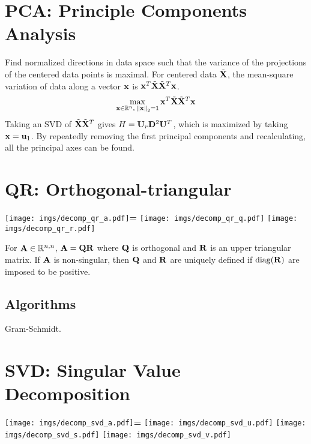 \section{PCA: Principle Components Analysis}
Find normalized directions in data space such that the variance of the projections of the centered data points is maximal. For centered data $\tilde {\mathbf{X}}$, the mean-square variation of data along a vector $\mathbf{x}$ is $\mathbf{x}^T \tilde {\mathbf{X}} \tilde {\mathbf{X}}^T \mathbf{x}$.
\begin{equation}
\max_{\mathbf{x}\in\mathbb{R}^{n},~\norm{\mathbf{x}}_2=1} \mathbf{x}^T \tilde {\mathbf{X}} \tilde {\mathbf{X}}^T \mathbf{x}
\end{equation}
Taking an SVD of $\tilde {\mathbf{X}} \tilde {\mathbf{X}}^T$ gives $H=\mathbf{U}_r\mathbf{D}^2\mathbf{U}^T$, which is maximized by taking $\mathbf{x}=\mathbf{u}_1$. By repeatedly removing the first principal components and recalculating, all the principal axes can be found.




\section{QR: Orthogonal-triangular}

\begin{center}
\texttt{[image: imgs/decomp\_qr\_a.pdf]}\textbf{\large =}
\texttt{[image: imgs/decomp\_qr\_q.pdf]}\textbf{\large *}
\texttt{[image: imgs/decomp\_qr\_r.pdf]}
\end{center}

For $\mathbf{A}\in\mathbb{R}^{n,n}$, $\mathbf{A}=\mathbf{Q}\mathbf{R}$ where $\mathbf{Q}$ is orthogonal and $\mathbf{R}$ is an upper triangular matrix. If $\mathbf{A}$ is non-singular, then $\mathbf{Q}$ and $\mathbf{R}$ are uniquely defined if $\operatorname{diag}(\mathbf{R})$ are imposed to be positive.

\subsection*{Algorithms}

Gram-Schmidt.




\section{SVD: Singular Value Decomposition}

\begin{center}
\texttt{[image: imgs/decomp\_svd\_a.pdf]}\textbf{\large =}
\texttt{[image: imgs/decomp\_svd\_u.pdf]}\textbf{\large *}
\texttt{[image: imgs/decomp\_svd\_s.pdf]}\textbf{\large *}
\texttt{[image: imgs/decomp\_svd\_v.pdf]}
\end{center}

